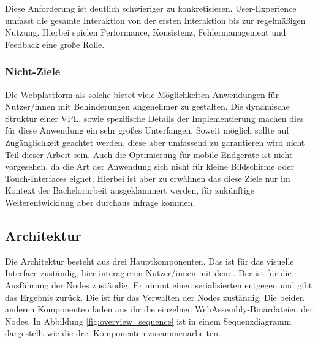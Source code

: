 \documentclass[ngerman]{article}
\begin{document}
Diese Anforderung ist deutlich schwieriger zu konkretisieren. User-Experience umfasst die gesamte Interaktion von der ersten Interaktion bis zur regelmäßigen Nutzung.
Hierbei spielen Performance, Konsistenz, Fehlermanagement und Feedback eine große Rolle.
\br
{}

\subsubsection{Nicht-Ziele}

Die Webplattform als solche bietet viele Möglichkeiten Anwendungen für Nutzer/innen mit Behinderungen angenehmer zu gestalten. 
Die dynamische Struktur einer VPL, sowie spezifische Details der Implementierung machen dies für diese Anwendung ein sehr großes Unterfangen. 
Soweit möglich sollte auf Zugänglichkeit geachtet werden, diese aber umfassend zu garantieren wird nicht Teil dieser Arbeit sein.
\br
Auch die Optimierung für mobile Endgeräte ist nicht vorgesehen, da die Art der Anwendung sich nicht für kleine Bildschirme oder Touch-Interfaces eignet.
\br
Hierbei ist aber zu erwähnen das diese Ziele nur im Kontext der Bachelorarbeit ausgeklammert werden, für zukünftige Weiterentwicklung aber durchaus infrage kommen.

\pagebreak

\subsection{Architektur}
\label{sec:Architektur}

Die Architektur besteht aus drei Hauptkomponenten. 
Das  ist für das visuelle Interface zuständig, hier interagieren Nutzer/innen mit dem .
Der  ist für die Ausführung der Nodes zuständig. Er nimmt einen serialisierten  entgegen und gibt das Ergebnis zurück.
Die  ist für das Verwalten der Nodes zuständig. Die beiden anderen Komponenten laden aus ihr die einzelnen WebAssembly-Binärdateien der Nodes.
\br
In Abbildung \ref{fig:overview_sequence} ist in einem Sequenzdiagramm dargestellt wie die drei Komponenten zusammenarbeiten.
\end{document}
